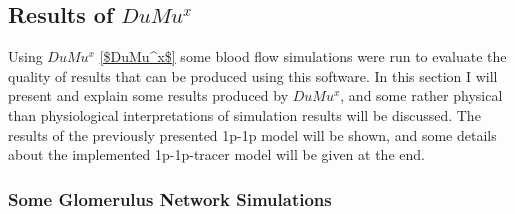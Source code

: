 \newpage
\subsection{Results of $DuMu^x$} 

Using $DuMu^x$ \ref{$DuMu^x$} some blood flow simulations were run to evaluate the quality of results that can be produced using this software. In this section I will present and explain some results produced by $DuMu^x$, and some rather physical than physiological interpretations of simulation results will be discussed. The results of the previously presented 1p-1p model will be shown, and some details about the implemented 1p-1p-tracer model will be given at the end.

\subsubsection*{Some Glomerulus Network Simulations}

